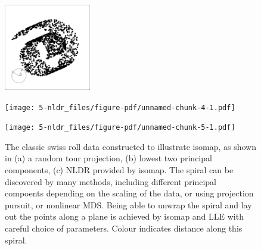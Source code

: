 \documentclass[
  letterpaper,
]{krantz}
\begin{document}
\begin{figure}

\begin{minipage}{0.33\linewidth}

\includegraphics[width=1.48958in,height=\textheight,keepaspectratio]{images/swiss.png}

\end{minipage}%
%
\begin{minipage}{0.33\linewidth}

\texttt{[image: 5-nldr\_files/figure-pdf/unnamed-chunk-4-1.pdf]}

\end{minipage}%
%
\begin{minipage}{0.33\linewidth}

\texttt{[image: 5-nldr\_files/figure-pdf/unnamed-chunk-5-1.pdf]}

\end{minipage}%

\caption{\label{fig-swiss-pdf}The classic swiss roll data constructed to
illustrate isomap, as shown in (a) a random tour projection, (b) lowest
two principal components, (c) NLDR provided by isomap. The spiral can be
discovered by many methods, including different principal compoents
depending on the scaling of the data, or using projection pursuit, or
nonlinear MDS. Being able to unwrap the spiral and lay out the points
along a plane is achieved by isomap and LLE with careful choice of
parameters. Colour indicates distance along this spiral.
}

\end{figure}%

 
\end{document}
